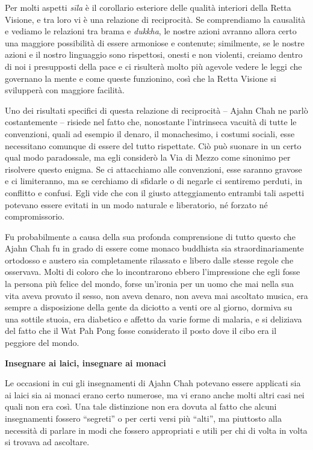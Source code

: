 Per molti aspetti \emph{sīla} è il corollario esteriore delle qualità
interiori della Retta Visione, e tra loro vi è una relazione di
reciprocità. Se comprendiamo la causalità e vediamo le relazioni tra
brama e \emph{dukkha}, le nostre azioni avranno allora certo una
maggiore possibilità di essere armoniose e contenute; similmente, se le
nostre azioni e il nostro linguaggio sono rispettosi, onesti e non
violenti, creiamo dentro di noi i presupposti della pace e ci risulterà
molto più agevole vedere le leggi che governano la mente e come queste
funzionino, così che la Retta Visione si svilupperà con maggiore
facilità.

Uno dei risultati specifici di questa relazione di reciprocità -- Ajahn
Chah ne parlò costantemente -- risiede nel fatto che, nonostante
l'intrinseca vacuità di tutte le convenzioni, quali ad esempio il
denaro, il monachesimo, i costumi sociali, esse necessitano comunque di
essere del tutto rispettate. Ciò può suonare in un certo qual modo
paradossale, ma egli considerò la Via di Mezzo come sinonimo per
risolvere questo enigma. Se ci attacchiamo alle convenzioni, esse
saranno gravose e ci limiteranno, ma se cerchiamo di sfidarle o di
negarle ci sentiremo perduti, in conflitto e confusi. Egli vide che con
il giusto atteggiamento entrambi tali aspetti potevano essere evitati in
un modo naturale e liberatorio, né forzato né compromissorio.

Fu probabilmente a causa della sua profonda comprensione di tutto questo
che Ajahn Chah fu in grado di essere come monaco buddhista sia
straordinariamente ortodosso e austero sia completamente rilassato e
libero dalle stesse regole che osservava. Molti di coloro che lo
incontrarono ebbero l'impressione che egli fosse la persona più felice
del mondo, forse un'ironia per un uomo che mai nella sua vita aveva
provato il sesso, non aveva denaro, non aveva mai ascoltato musica, era
sempre a disposizione della gente da diciotto a venti ore al giorno,
dormiva su una sottile stuoia, era diabetico e affetto da varie forme di
malaria, e si deliziava del fatto che il Wat Pah Pong fosse considerato
il posto dove il cibo era il peggiore del mondo.

\textbf{Insegnare ai laici, insegnare ai monaci}

Le occasioni in cui gli insegnamenti di Ajahn Chah potevano essere
applicati sia ai laici sia ai monaci erano certo numerose, ma vi erano
anche molti altri casi nei quali non era così. Una tale distinzione non
era dovuta al fatto che alcuni insegnamenti fossero ``segreti'' o per
certi versi più ``alti'', ma piuttosto alla necessità di parlare in modi
che fossero appropriati e utili per chi di volta in volta si trovava ad
ascoltare.

